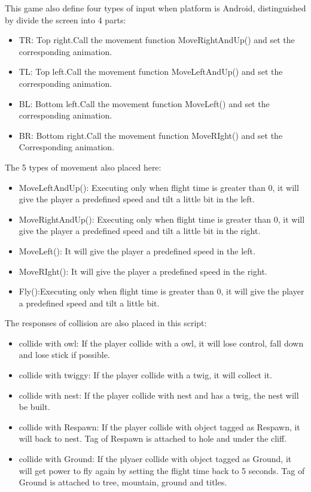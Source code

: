 \documentclass[12pt]{article}
\begin{document}
This game also define four types of input when platform is Android, distinguished by divide the screen into 4 parts:
\begin{itemize}
\item TR: Top right.Call the movement function MoveRightAndUp() and set the corresponding animation.
\item TL: Top left.Call the movement function MoveLeftAndUp() and set the corresponding animation.
\item BL: Bottom left.Call the movement function MoveLeft() and set the corresponding animation.
\item BR: Bottom right.Call the movement function MoveRIght() and set the Corresponding animation.
\end{itemize}
The 5 types of movement also placed here:
\begin{itemize}
\item MoveLeftAndUp(): Executing only when flight time is greater than 0, it will give the player a predefined speed and tilt a little bit in the left.
\item MoveRightAndUp(): Executing only when flight time is greater than 0, it will give the player a predefined speed and tilt a little bit in the right.
\item MoveLeft(): It will give the player a predefined speed in the left.
\item MoveRIght(): It will give the player a predefined speed in the right.
\item Fly():Executing only when flight time is greater than 0, it will give the player a predefined speed and tilt a little bit.
\end{itemize}

The responses of collision are also placed in this script:
\begin{itemize}
\item collide with owl: If the player collide with a owl, it will lose control, fall down and lose stick if possible.
\item collide with twiggy: If the player collide with a twig, it will collect it.
\item collide with nest: If the player collide with nest and has a twig, the nest will be built.
\item collide with Respawn: If the player collide with object tagged as Respawn, it will back to nest. Tag of Respawn is attached to hole and under the cliff.
\item collide with Ground: If the plyaer collide with object tagged as Ground, it will get power to fly again by setting the flight time back to 5 seconds. Tag of Ground is attached to tree, mountain, ground and titles.
\end{itemize}
\end{document}
